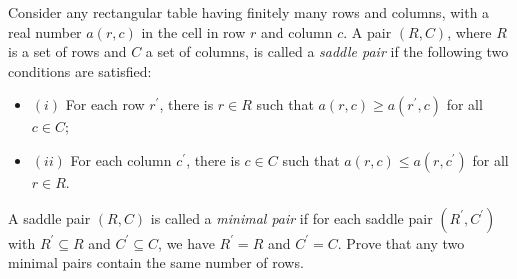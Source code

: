 Consider any rectangular table having finitely many rows and columns, with a real number $a(r, c)$ in the cell in row $r$ and column $c$. A pair $(R, C)$, where $R$ is a set of rows and $C$ a set of columns, is called a \textit{saddle pair} if the following two conditions are satisfied:
\begin{itemize}
	\item $(i)$ For each row $r^{\prime}$, there is $r \in R$ such that $a(r, c) \geqslant a\left(r^{\prime}, c\right)$ for all $c \in C$;
	\item $(ii)$ For each column $c^{\prime}$, there is $c \in C$ such that $a(r, c) \leqslant a\left(r, c^{\prime}\right)$ for all $r \in R$.
\end{itemize}
A saddle pair $(R, C)$ is called a \textit{minimal pair} if for each saddle pair $\left(R^{\prime}, C^{\prime}\right)$ with $R^{\prime} \subseteq R$ and $C^{\prime} \subseteq C$, we have $R^{\prime}=R$ and $C^{\prime}=C$. Prove that any two minimal pairs contain the same number of rows.